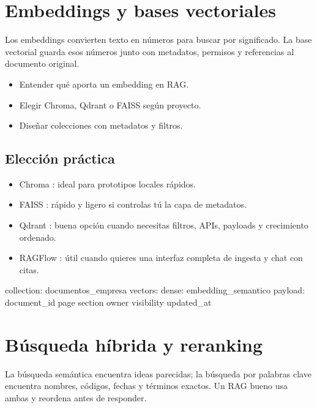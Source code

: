 \documentclass[11pt,a4paper]{book}
\begin{document}
\chapter{Embeddings y bases vectoriales}
Los embeddings convierten texto en números para buscar por significado. La base vectorial guarda esos números junto con metadatos, permisos y referencias al documento original.

\begin{itemize}\item Entender qué aporta un embedding en RAG.\end{itemize}
\begin{itemize}\item Elegir Chroma, Qdrant o FAISS según proyecto.\end{itemize}
\begin{itemize}\item Diseñar colecciones con metadatos y filtros.\end{itemize}
\section{Elección práctica}
\begin{itemize}\item Chroma : ideal para prototipos locales rápidos.\end{itemize}
\begin{itemize}\item FAISS : rápido y ligero si controlas tú la capa de metadatos.\end{itemize}
\begin{itemize}\item Qdrant : buena opción cuando necesitas filtros, APIs, payloads y crecimiento ordenado.\end{itemize}
\begin{itemize}\item RAGFlow : útil cuando quieres una interfaz completa de ingesta y chat con citas.\end{itemize}
\begin{codebox}
collection: documentos_empresa
vectors:
  dense: embedding_semantico
payload:
  document_id
  page
  section
  owner
  visibility
  updated_at
\end{codebox}
\chapter{Búsqueda híbrida y reranking}
La búsqueda semántica encuentra ideas parecidas; la búsqueda por palabras clave encuentra nombres, códigos, fechas y términos exactos. Un RAG bueno usa ambas y reordena antes de responder.
\end{document}
